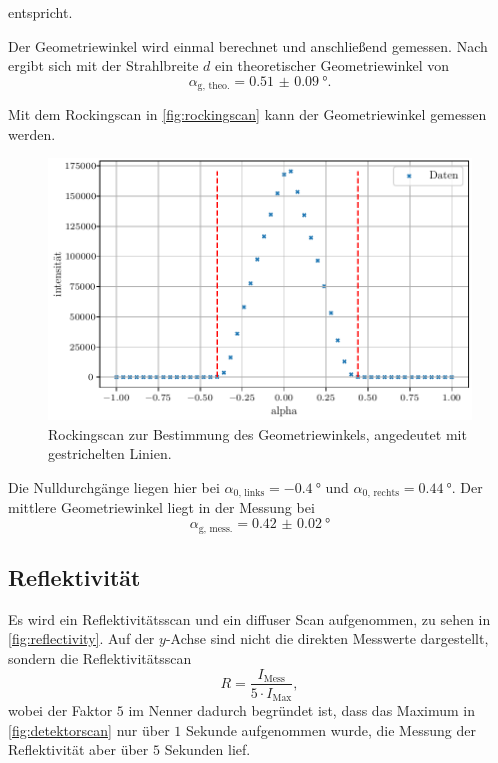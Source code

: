 entspricht. 

Der Geometriewinkel wird einmal berechnet und anschließend gemessen. Nach %
ergibt sich mit der Strahlbreite $d$ ein theoretischer Geometriewinkel von
\begin{equation*}
    \alpha_\text{g, theo.} = \qty{0.51(9)}{\degree}.
\end{equation*}

Mit dem Rockingscan in \autoref{fig:rockingscan} kann der Geometriewinkel gemessen werden.

\begin{figure}[H]
    \centering
    \includegraphics[width=\textwidth]{plots/rockingscan.pdf}
    \caption{Rockingscan zur Bestimmung des Geometriewinkels, angedeutet mit gestrichelten Linien.}
    \label{fig:rockingscan}
\end{figure}

Die Nulldurchgänge liegen hier bei $\alpha_{0\text{, links}} = \qty{-0.4}{\degree}$ und $\alpha_{0\text{, rechts}} = \qty{0.44}{\degree}$.
Der mittlere Geometriewinkel liegt in der Messung bei 
\begin{equation*}
    \alpha_\text{g, mess.} = \qty{0.42(2)}{\degree}
\end{equation*}

\subsection{Reflektivität}

Es wird ein Reflektivitätsscan und ein diffuser Scan aufgenommen, zu sehen in \autoref{fig:reflectivity}. Auf der $y$-Achse sind nicht die direkten Messwerte dargestellt, sondern die Reflektivitätsscan
\begin{equation*}
    R = \frac{I_\text{Mess}}{5\cdot I_\text{Max}},
\end{equation*}
wobei der Faktor $5$ im Nenner dadurch begründet ist, dass das Maximum in \autoref{fig:detektorscan} nur über $1$ Sekunde aufgenommen wurde, die Messung der Reflektivität aber über $5$ Sekunden lief.

